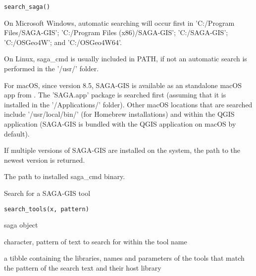 \documentclass[a4paper]{book}
\begin{document}
%
\begin{Usage}
\begin{verbatim}
search_saga()
\end{verbatim}
\end{Usage}
%
\begin{Details}
On Microsoft Windows, automatic searching will occur first in 'C:/Program
Files/SAGA-GIS'; 'C:/Program Files (x86)/SAGA-GIS'; 'C:/SAGA-GIS';
'C:/OSGeo4W'; and 'C:/OSGeo4W64'.

On Linux, saga\_cmd is usually included in PATH, if not an automatic search is
performed in the '/usr/' folder.

For macOS, since version 8.5, SAGA-GIS is available as an standalone macOS
app from . The
'SAGA.app' package is searched first (assuming that it is installed in the
'/Applications/' folder). Other macOS locations that are searched include
'/usr/local/bin/' (for Homebrew installations) and within the QGIS application
(SAGA-GIS is bundled with the QGIS application on macOS by default).

If multiple versions of SAGA-GIS are installed on the system, the path to the
newest version is returned.
\end{Details}
%
\begin{Value}
The path to installed saga\_cmd binary.
\end{Value}
%
\begin{Description}
Search for a SAGA-GIS tool
\end{Description}
%
\begin{Usage}
\begin{verbatim}
search_tools(x, pattern)
\end{verbatim}
\end{Usage}
%
\begin{Arguments}
\begin{ldescription}
\item[\code{x}] saga object

\item[\code{pattern}] character, pattern of text to search for within the tool name
\end{ldescription}
\end{Arguments}
%
\begin{Value}
a tibble containing the libraries, names and parameters of the tools
that match the pattern of the search text and their host library
\end{Value}
\end{document}
